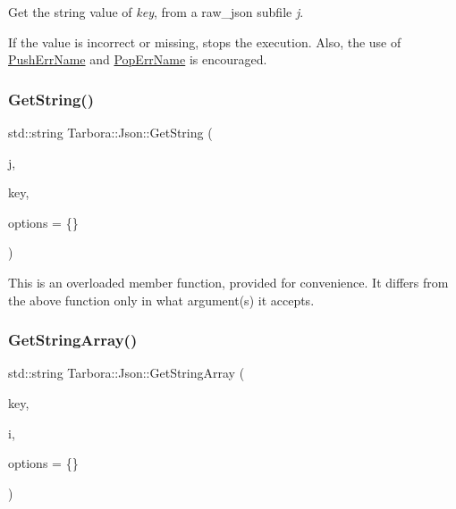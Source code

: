 Get the string value of {\itshape key}, from a raw\+\_\+json subfile {\itshape j}. 

If the value is incorrect or missing, stops the execution. Also, the use of \hyperlink{classTarbora_1_1Json_a061eac4f16dac3b9b3a26a66de0ea8f0}{Push\+Err\+Name} and \hyperlink{classTarbora_1_1Json_a14019f06d3bd76edd6a6e78134519d11}{Pop\+Err\+Name} is encouraged. \mbox{\label{classTarbora_1_1Json_a3dc165dd8a91c9198fe436106c0b8c1d}} 
\subsubsection{\texorpdfstring{Get\+String()}{GetString()}\hspace{0.1cm}{\footnotesize\ttfamily [3/3]}}
{\footnotesize\ttfamily std\+::string Tarbora\+::\+Json\+::\+Get\+String (\begin{DoxyParamCaption}\item[{raw\+\_\+json}]{j,  }\item[{int}]{key,  }\item[{\hyperlink{structTarbora_1_1JsonOptions}{Json\+Options}}]{options = {\ttfamily \{\}} }\end{DoxyParamCaption})}

This is an overloaded member function, provided for convenience. It differs from the above function only in what argument(s) it accepts. \mbox{\label{classTarbora_1_1Json_a14da3578c062f1291d1957146569dabf}} 
\subsubsection{\texorpdfstring{Get\+String\+Array()}{GetStringArray()}\hspace{0.1cm}{\footnotesize\ttfamily [1/2]}}
{\footnotesize\ttfamily std\+::string Tarbora\+::\+Json\+::\+Get\+String\+Array (\begin{DoxyParamCaption}\item[{const char $\ast$}]{key,  }\item[{int}]{i,  }\item[{\hyperlink{structTarbora_1_1JsonOptions}{Json\+Options}}]{options = {\ttfamily \{\}} }\end{DoxyParamCaption})}



